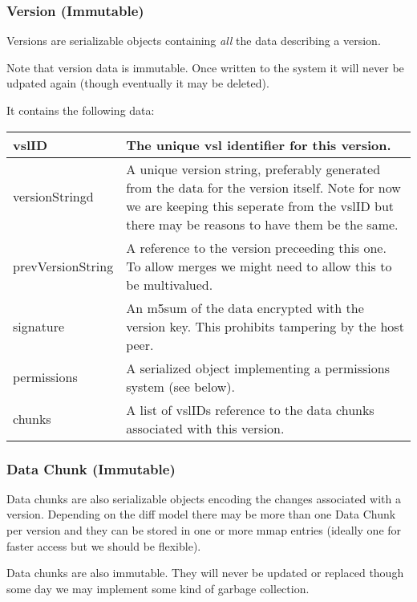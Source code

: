 \documentclass[10pt]{article}
\begin{document}
\subsubsection{Version (Immutable)}

Versions are serializable objects containing {\em all} the data describing a
version. 

Note that version data is immutable.  Once written to the system it will never
be udpated again (though eventually it may be deleted).

It contains the following data:


\begin{tabular}{|l|p{12cm}|}
\hline
vslID & The unique vsl identifier for this version.\\
\hline
versionStringd &  A unique version string, preferably generated from the data
for the version itself. Note for now we are keeping this seperate from the vslID
but there may be reasons to have them be the same.\\
\hline
prevVersionString & A reference to the version preceeding this one.  To allow merges we might need to allow this to be multivalued.\\
\hline
signature & An m5sum of the data encrypted with the version key.  This prohibits tampering by the host peer.\\
\hline
permissions & A serialized object implementing a permissions system (see below).\\
\hline
chunks & A list of vslIDs reference to the data chunks associated with this version.\\
\hline
\end{tabular}


\subsubsection{Data Chunk (Immutable)}

Data chunks are also serializable objects encoding the changes associated with
a version.  Depending on the diff model there may be more than one Data Chunk
per version and they can be stored in one or more mmap entries (ideally one for
faster access but we should be flexible).

Data chunks are also immutable.  They will never be updated or replaced though
some day we may implement some kind of garbage collection.
\end{document}
